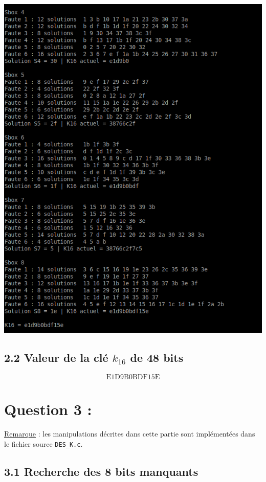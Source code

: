 			\begin{center}\includegraphics[scale=0.8]{K16.png}\end{center}
			
		\subsection*{2.2 Valeur de la clé $k_{16}$ de 48 bits}
		\[ \textrm{E1D9B0BDF15E} \]
		
	\section*{Question 3 :}
		
		\noindent \underline{Remarque} : les manipulations décrites dans cette partie sont implémentées dans le fichier source \lstinline!DES_K.c!.
		
		\subsection*{3.1 Recherche des 8 bits manquants}
		
		

